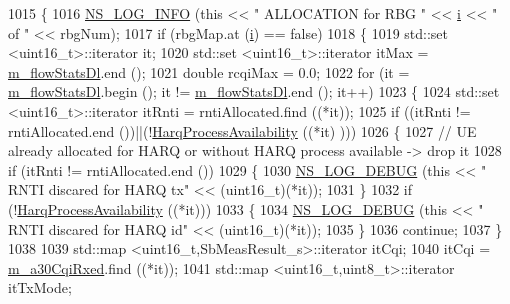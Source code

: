 \begin{DoxyCode}
1015     \{
1016       \hyperlink{group__logging_gafbd73ee2cf9f26b319f49086d8e860fb}{NS\_LOG\_INFO} (\textcolor{keyword}{this} << \textcolor{stringliteral}{" ALLOCATION for RBG "} << \hyperlink{bernuolliDistribution_8m_a6f6ccfcf58b31cb6412107d9d5281426}{i} << \textcolor{stringliteral}{" of "} << rbgNum);
1017       \textcolor{keywordflow}{if} (rbgMap.at (\hyperlink{bernuolliDistribution_8m_a6f6ccfcf58b31cb6412107d9d5281426}{i}) == \textcolor{keyword}{false})
1018         \{
1019           std::set <uint16\_t>::iterator it;
1020           std::set <uint16\_t>::iterator itMax = \hyperlink{classns3_1_1FdMtFfMacScheduler_a9ab90c3a3648c998bf2ca6e6baee052c}{m\_flowStatsDl}.end ();
1021           \textcolor{keywordtype}{double} rcqiMax = 0.0;
1022           \textcolor{keywordflow}{for} (it = \hyperlink{classns3_1_1FdMtFfMacScheduler_a9ab90c3a3648c998bf2ca6e6baee052c}{m\_flowStatsDl}.begin (); it != \hyperlink{classns3_1_1FdMtFfMacScheduler_a9ab90c3a3648c998bf2ca6e6baee052c}{m\_flowStatsDl}.end (); it++)
1023             \{
1024               std::set <uint16\_t>::iterator itRnti = rntiAllocated.find ((*it));
1025               \textcolor{keywordflow}{if} ((itRnti != rntiAllocated.end ())||(!\hyperlink{classns3_1_1FdMtFfMacScheduler_a118146b9ceb2f414d8c7fa3a46afe5b4}{HarqProcessAvailability} ((*it)
      )))
1026                 \{
1027                   \textcolor{comment}{// UE already allocated for HARQ or without HARQ process available -> drop it}
1028                   \textcolor{keywordflow}{if} (itRnti != rntiAllocated.end ())
1029                   \{
1030                     \hyperlink{group__logging_ga413f1886406d49f59a6a0a89b77b4d0a}{NS\_LOG\_DEBUG} (\textcolor{keyword}{this} << \textcolor{stringliteral}{" RNTI discared for HARQ tx"} << (uint16\_t)(*it));
1031                   \}
1032                   \textcolor{keywordflow}{if} (!\hyperlink{classns3_1_1FdMtFfMacScheduler_a118146b9ceb2f414d8c7fa3a46afe5b4}{HarqProcessAvailability} ((*it)))
1033                   \{
1034                     \hyperlink{group__logging_ga413f1886406d49f59a6a0a89b77b4d0a}{NS\_LOG\_DEBUG} (\textcolor{keyword}{this} << \textcolor{stringliteral}{" RNTI discared for HARQ id"} << (uint16\_t)(*it));
1035                   \}
1036                   \textcolor{keywordflow}{continue};
1037                 \}
1038 
1039               std::map <uint16\_t,SbMeasResult\_s>::iterator itCqi;
1040               itCqi = \hyperlink{classns3_1_1FdMtFfMacScheduler_a21ff76bdadf27aac3b87c43f3bc343c8}{m\_a30CqiRxed}.find ((*it));
1041               std::map <uint16\_t,uint8\_t>::iterator itTxMode;

\end{DoxyCode}
